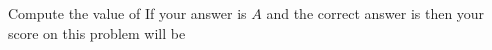 Compute the value of   If your answer is $A$ and the correct answer is  then your score on this problem will be 